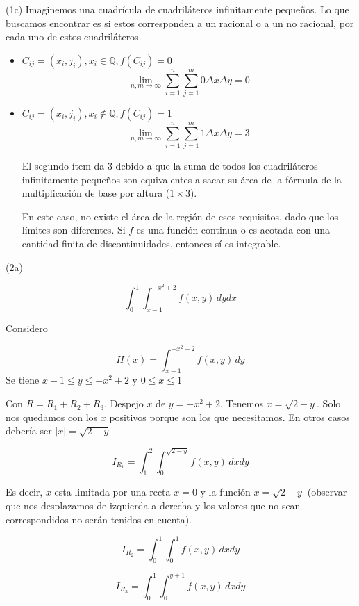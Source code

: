 \begin{exercise}

(1c) Imaginemos una cuadr\'icula de cuadril\'ateros infinitamente pequeños. Lo que buscamos encontrar es si estos corresponden a un racional o a un no racional, por cada uno de estos cuadril\'ateros.

\begin{itemize}

\item $C_{ij}=(x_i,j_i),x_i \in \mathbb{Q},f(C_{ij})=0$
$$
\lim\limits_{n,m \longrightarrow \infty}\sum_{i=1}^{n}\sum_{j=1}^{m}0\Delta x \Delta y = 0
$$

\item $C_{ij}=(x_i,j_i),x_i \not\in \mathbb{Q},f(C_{ij})=1$
$$
\lim\limits_{n,m \longrightarrow \infty}\sum_{i=1}^{n}\sum_{j=1}^{m}1\Delta x \Delta y = 3
$$

El segundo \'item da 3 debido a que la suma de todos los cuadril\'ateros infinitamente pequeños son equivalentes a sacar su \'area de la f\'ormula de la multiplicaci\'on de base por altura ($1\times 3$).

En este caso, no existe el \'area de la regi\'on de esos requisitos, dado que los l\'imites son diferentes. Si $f$ es una funci\'on continua o es acotada con una cantidad finita de discontinuidades, entonces s\'i es integrable.

\end{itemize}

\end{exercise}

\begin{exercise}

(2a) 

$$ \int_0^1 \int_{x-1}^{-x^2 + 2} \! f(x,y) \, dydx $$

Considero

$$ H(x) = \int_{x-1}^{-x^2 + 2} \! f(x,y) \, dy $$
Se tiene $ x - 1 \leq y \leq -x^2 + 2 $ y $ 0 \leq x \leq 1 $


Con $R = R_1 + R_2 + R_3 $. Despejo $x$ de $y = -x^2 + 2$. Tenemos $x = \sqrt{2-y}$. Solo nos quedamos con los $x$ positivos porque son los que necesitamos. En otros casos deber\'ia ser $\left|x\right| = \sqrt{2-y}$
 
$$ I_{R_1} = \int_1^2 \int_0^{\sqrt{2-y}} \! f(x,y) \, dx dy$$

Es decir, $x$ esta limitada por una recta $x = 0$ y la funci\'on $x = \sqrt{2-y}$ (observar que nos desplazamos de izquierda a derecha y los valores que no sean correspondidos no ser\'an tenidos en cuenta).

$$ I_{R_2} = \int_0^1 \int_0^1 \! f(x,y) \, dx dy$$

$$ I_{R_3} = \int_0^1 \int_0^{y+1} \! f(x,y) \, dx dy$$

\end{exercise}

